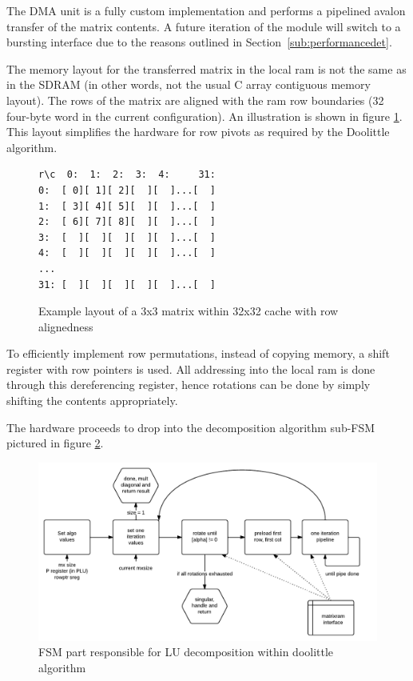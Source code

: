 \documentclass[]{article}
\begin{document}
The DMA unit is a fully custom implementation and performs a pipelined avalon transfer of the matrix contents. A future iteration of the module will switch to a bursting interface due to the reasons outlined in Section~\ref{sub:performancedet}. 

The memory layout for the transferred matrix in the local ram is not the same as in the SDRAM (in other words, not the usual C array contiguous memory layout). The rows of the matrix are aligned with the ram row boundaries (32 four-byte word in the current configuration).  An illustration is shown in figure \ref{fig:memlayout}. This layout simplifies the hardware for row pivots as required by the Doolittle algorithm.

\begin{figure}[htbp]
	\begin{center}
		\begin{lstlisting}
r\c  0:  1:  2:  3:  4:     31:
0:  [ 0][ 1][ 2][  ][  ]...[  ]
1:  [ 3][ 4][ 5][  ][  ]...[  ]
2:  [ 6][ 7][ 8][  ][  ]...[  ]
3:  [  ][  ][  ][  ][  ]...[  ]
4:  [  ][  ][  ][  ][  ]...[  ]
...
31: [  ][  ][  ][  ][  ]...[  ]

		\end{lstlisting}
	\end{center}
	\caption{Example layout of a 3x3 matrix within 32x32 cache with row alignedness}
	\label{fig:memlayout}
\end{figure}

To efficiently implement row permutations, instead of copying memory, a shift register with row pointers is used. All addressing into the local ram is done through this dereferencing register, hence rotations can be done by simply shifting the contents appropriately.

The hardware proceeds to drop into the decomposition algorithm sub-FSM pictured in figure \ref{fig:doolittle_fsm}.
\begin{figure}[htbp]
	\begin{center}
		\includegraphics[width = 1\textwidth]{DSDDoolitleFSM.pdf}
	\end{center}
	\caption{FSM part responsible for LU decomposition within doolittle algorithm}
	\label{fig:doolittle_fsm}
\end{figure}
\end{document}
